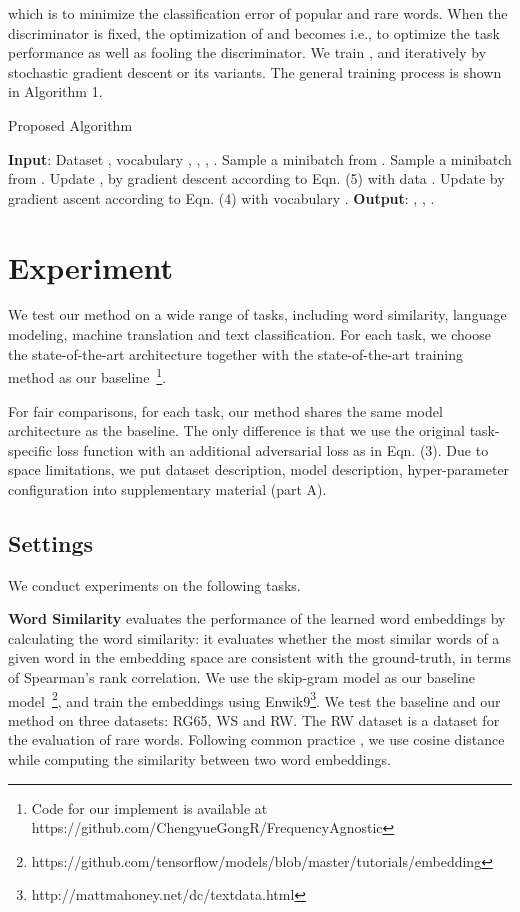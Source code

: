 \documentclass{article}
\begin{document}
which is to minimize the classification error of popular and rare words. When the discriminator  is fixed, the optimization of  and  becomes 
i.e., to optimize the task performance as well as fooling the discriminator. We train ,  and  iteratively by stochastic gradient descent or its variants. The general training process is shown in Algorithm 1.

\begin{algorithm}
\caption{Proposed Algorithm}\label{alg}
\begin{algorithmic}[1]
\State \textbf{Input}: Dataset , vocabulary , , , .
\Repeat
\State Sample a minibatch  from .
\State Sample a minibatch  from .
\State Update ,  by gradient descent according to Eqn. (5) with data .
\State Update  by gradient ascent according to Eqn. (4) with vocabulary .
\State \textbf{Output}: , , .
\end{algorithmic}
\end{algorithm}



\section{Experiment}
\label{Experiment}
We test our method on a wide range of tasks, including word similarity, language modeling, machine translation and text classification. For each task, we choose the state-of-the-art architecture together with the state-of-the-art training method as our baseline~\footnote{Code for our implement is available at https://github.com/ChengyueGongR/FrequencyAgnostic}.

For fair comparisons, for each task, our method shares the same model architecture as the baseline. The only difference is that we use the original task-specific loss function with an additional adversarial loss as in Eqn. (3). Due to space limitations, we put dataset description, model description, hyper-parameter configuration into supplementary material (part A).

\subsection{Settings}
We conduct experiments on the following tasks.

\textbf{Word Similarity} evaluates the performance of the learned word embeddings by calculating the word similarity: it evaluates whether the most similar words of a given word in the embedding space are consistent with the ground-truth, in terms of Spearman’s rank correlation. We use the skip-gram model as our baseline model~\cite{mikolov2013distributed}\footnote{https://github.com/tensorflow/models/blob/master/tutorials/embedding}, and train the embeddings using Enwik9\footnote{
http://mattmahoney.net/dc/textdata.html}. We test the baseline and our method on three datasets: RG65, WS and RW. The RW dataset is a dataset for the evaluation of rare words. Following common practice \cite{mikolov2013distributed,polyglot:2013:ACL-CoNLL,DBLP:conf/emnlp/PenningtonSM14,mu2017all}, we use cosine distance while computing the similarity between two word embeddings.
\end{document}
